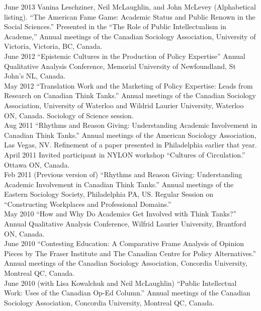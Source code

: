 \documentclass[11pt,usenames,dvipsnames]{article}
\begin{document}
\ind June 2013 Vanina Leschziner, Neil McLaughlin, and John McLevey (Alphabetical listing). ``The American Fame Game: Academic Status and Public Renown in the Social Sciences.'' Presented in the ``The Role of Public Intellectualism in Academe,'' Annual meetings of the Canadian Sociology Association, University of Victoria, Victoria, BC, Canada. \\

\ind June 2012 ``Epistemic Cultures in the Production of Policy Expertise'' Annual Qualitative Analysis Conference, Memorial University of Newfoundland, St John's NL, Canada.\\

\ind May 2012 ``Translation Work and the Marketing of Policy Expertise: Leads from Research on Canadian Think Tanks.'' Annual meetings of the Canadian Sociology Association, University of Waterloo and Wildrid Laurier University, Waterloo ON, Canada. Sociology of Science session.\\

\ind Aug 2011 ``Rhythms and Reason Giving: Understanding Academic Involvement in Canadian Think Tanks.'' Annual meetings of the American Sociology Association, Las Vegas, NV. Refinement of a paper presented in Philadelphia earlier that year. \\

\ind April 2011 Invited participant in NYLON workshop ``Cultures of Circulation.'' Ottawa ON, Canada.\\

\ind Feb 2011 (Previous version of) ``Rhythms and Reason Giving: Understanding Academic Involvement in Canadian Think Tanks.'' Annual meetings of the Eastern Sociology Society, Philadelphia PA, US. Regular Session on ``Constructing Workplaces and Professional Domains.''\\

\ind May 2010 ``How and Why Do Academics Get Involved with Think Tanks?'' Annual Qualitative Analysis Conference, Wilfrid Laurier University, Brantford ON, Canada.\\

\ind June 2010 ``Contesting Education: A Comparative Frame Analysis of Opinion Pieces by The Fraser Institute and The Canadian Centre for Policy Alternatives.'' Annual meetings  of the Canadian Sociology Association, Concordia University, Montreal QC, Canada.\\

\ind June 2010 (with Lisa Kowalchuk and Neil McLaughlin) ``Public Intellectual Work: Uses of the Canadian Op-Ed Column.'' Annual meetings of the Canadian Sociology Association, Concordia University, Montreal QC, Canada.\\
\end{document}

